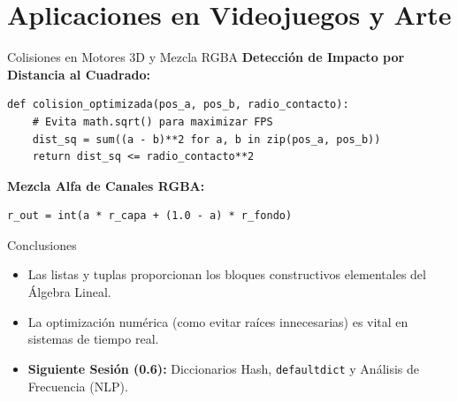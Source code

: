 \documentclass[aspectratio=169]{beamer}
\begin{document}
\section{Aplicaciones en Videojuegos y Arte}

\begin{frame}[fragile]{Colisiones en Motores 3D y Mezcla RGBA}
    \textbf{Detección de Impacto por Distancia al Cuadrado:}
\begin{lstlisting}
def colision_optimizada(pos_a, pos_b, radio_contacto):
    # Evita math.sqrt() para maximizar FPS
    dist_sq = sum((a - b)**2 for a, b in zip(pos_a, pos_b))
    return dist_sq <= radio_contacto**2
\end{lstlisting}
    \vspace{0.2cm}
    \textbf{Mezcla Alfa de Canales RGBA:}
\begin{lstlisting}
r_out = int(a * r_capa + (1.0 - a) * r_fondo)
\end{lstlisting}
\end{frame}

\begin{frame}{Conclusiones}
    \begin{itemize}
        \item Las listas y tuplas proporcionan los bloques constructivos elementales del Álgebra Lineal.
        \item La optimización numérica (como evitar raíces innecesarias) es vital en sistemas de tiempo real.
        \item \textbf{Siguiente Sesión (0.6):} Diccionarios Hash, \texttt{defaultdict} y Análisis de Frecuencia (NLP).
    \end{itemize}
\end{frame}
\end{document}

